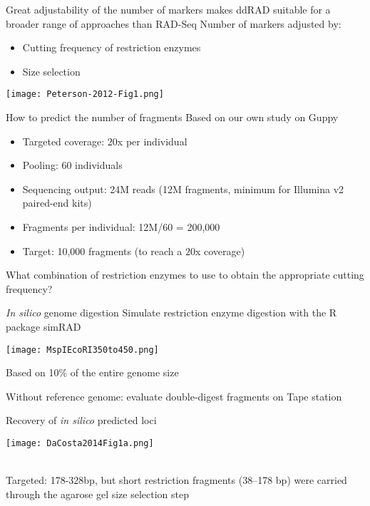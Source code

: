\documentclass[presentation]{beamer}
\begin{document}
\begin{frame}[label=sec-2-2-4]{Great adjustability of the number of markers makes ddRAD suitable for a broader range of approaches than RAD-Seq}
Number of markers adjusted by:
\begin{itemize}
\item Cutting frequency of restriction enzymes
\item Size selection
\end{itemize}
\texttt{[image: Peterson-2012-Fig1.png]}   
\begin{center}
\tiny{\citep{Peterson2012}}
\end{center}
\end{frame}
\begin{frame}[label=sec-2-2-5]{How to predict the number of fragments}
Based on our own study on Guppy
\begin{itemize}
\item Targeted coverage: 20x per individual
\item Pooling: 60 individuals
\item Sequencing output: 24M reads (12M fragments, minimum for Illumina v2
paired-end kits)
\item Fragments per individual: 12M/60 = 200,000

\item Target: \alert{10,000} fragments (to reach a 20x coverage)
\end{itemize}

What combination of restriction enzymes to use to obtain the appropriate cutting
frequency?
\end{frame}
\begin{frame}[label=sec-2-2-6]{\emph{In silico} genome digestion}
Simulate restriction enzyme digestion with the R package simRAD \citep{Lepais2014}
\begin{center}
\texttt{[image: MspIEcoRI350to450.png]}

\small{Based on 10\% of the entire genome size}
\end{center}
Without reference genome: evaluate double-digest fragments on Tape station
\end{frame}

\begin{frame}[label=sec-2-2-7]{Recovery of \emph{in silico} predicted loci}
\begin{center}
\texttt{[image: DaCosta2014Fig1a.png]}

 \tiny{\citep{Dacosta2014}}\\
\small{Targeted: 178-328bp, but short restriction fragments (38–178 bp) were carried through the agarose gel size selection step}
 \end{center}
\end{frame}
\end{document}
